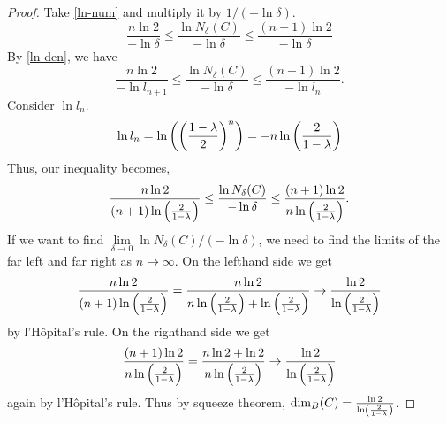 \documentclass[notitlepage]{simple}
\def\dim{\operatorname{dim}}
\begin{document}
\begin{proof}
		Take \autoref{ln-num} and multiply it by $1/(-\ln\delta)$.
		\[
			\frac{n\ln 2}{-\ln\delta} \leq \frac{\ln N_\delta(C)}{-\ln\delta} \leq \frac{(n+1)\ln 2}{-\ln\delta}
		\]
		By \autoref{ln-den}, we have
		\[
			\frac{n\ln 2}{-\ln l_{n+1}} \leq \frac{\ln N_\delta(C)}{-\ln\delta} \leq \frac{(n+1)\ln 2}{-\ln l_n}.
		\]
		Consider $\ln l_n$.
		\[
			\ln l_n = \ln\left( \left( \frac{1-\lambda}{2} \right)^n \right) = -n\ln\left( \frac{2}{1-\lambda} \right)
		\]
		Thus, our inequality becomes,
		\[
			\frac{n\ln 2}{(n+1)\ln\left( \frac{2}{1-\lambda} \right)} \leq \frac{\ln N_\delta(C)}{-\ln\delta} \leq \frac{(n+1)\ln 2}{n\ln\left( \frac{2}{1-\lambda} \right)}.
		\]
		If we want to find $\lim\limits_{\delta\rightarrow 0} \ln N_\delta(C)/(-\ln\delta)$, we need to find the limits of the far left and far right as $n\rightarrow\infty$.
		On the lefthand side we get
		\[
			\frac{n\ln 2}{(n+1)\ln\left( \frac{2}{1-\lambda} \right)} = \frac{n\ln 2}{n\ln\left( \frac{2}{1-\lambda} \right)+\ln\left( \frac{2}{1-\lambda} \right)}\rightarrow\frac{\ln 2}{\ln\left( \frac{2}{1-\lambda} \right)}
		\]
		by l'H\^opital's rule.
		On the righthand side we get
		\[
			\frac{(n+1)\ln 2}{n\ln\left( \frac{2}{1-\lambda} \right)} = \frac{n\ln 2+\ln 2}{n\ln\left( \frac{2}{1-\lambda} \right)}\rightarrow\frac{\ln 2}{\ln\left( \frac{2}{1-\lambda} \right)}
		\]
		again by l'H\^opital's rule.
		Thus by squeeze theorem, $\dim_B (C)=\frac{\ln 2}{\ln\paren{\frac{2}{1-\lambda}}}$.
	\end{proof}
\end{document}
